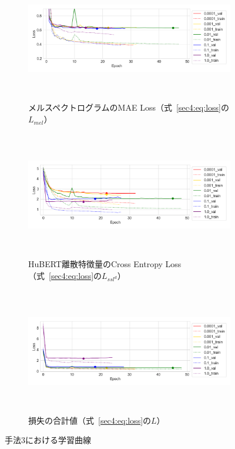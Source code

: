 \documentclass[12pt]{jarticle}
\numberwithin{equation}{section}    %
\numberwithin{figure}{section}      %
\numberwithin{table}{section}      %
\begin{document}
\begin{figure}[bt]
    \centering
    \begin{subfigure}{\linewidth}
        \centering
        \includegraphics[height=55mm]{./figure/sec4/learning_curve/impact_of_loss_weights_across_methods/3/mel_loss.png}
        \caption{メルスペクトログラムのMAE Loss（式~\eqref{sec4:eq:loss}の$L_{mel}$）}
        \label{sec4:fig:learning_curve_method_3_val_mel_loss}
    \end{subfigure}
    \begin{subfigure}{\linewidth}
        \centering
        \includegraphics[height=55mm]{./figure/sec4/learning_curve/impact_of_loss_weights_across_methods/3/ssl_feature_cluster_loss.png}
        \caption{HuBERT離散特徴量のCross Entropy Loss（式~\eqref{sec4:eq:loss}の$L_{ssl^{d}}$）}
        \label{sec4:fig:learning_curve_method_3_val_ssl_feature_cluster_loss}
    \end{subfigure}
    \begin{subfigure}{\linewidth}
        \centering
        \includegraphics[height=55mm]{./figure/sec4/learning_curve/impact_of_loss_weights_across_methods/3/total_loss.png}
        \caption{損失の合計値（式~\eqref{sec4:eq:loss}の$L$）}
        \label{sec4:fig:learning_curve_method_3_val_total_loss}
    \end{subfigure}
    \caption{手法3における学習曲線}
    \label{sec4:fig:learning_curve_method_3_val_losses}
\end{figure}
\end{document}
